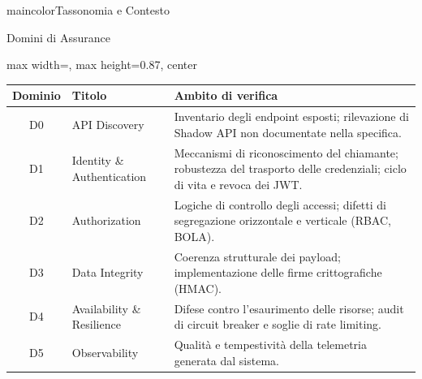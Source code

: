 


\begin{chapter}{maincolor}{Tassonomia e Contesto}
\end{chapter}

\begin{frame}{Domini di Assurance}
  \scriptsize
  \renewcommand{\arraystretch}{0.85}
  \begin{adjustbox}{max width=\textwidth, max height=0.87\textheight, center}
    \begin{tabularx}{\textwidth}{@{} c l >{\raggedright\arraybackslash}X @{}}
      \toprule
      \textbf{Dominio} & \textbf{Titolo}                   & \textbf{Ambito di verifica}                                                                                             \\
      \midrule
      D0               & API Discovery                     & Inventario degli endpoint esposti; rilevazione di Shadow API non documentate nella specifica.                           \\
      D1               & Identity \& Authentication        & Meccanismi di riconoscimento del chiamante; robustezza del trasporto delle credenziali; ciclo di vita e revoca dei JWT. \\
      D2               & Authorization                     & Logiche di controllo degli accessi; difetti di segregazione orizzontale e verticale (RBAC, BOLA).                       \\
      D3               & Data Integrity                    & Coerenza strutturale dei payload; implementazione delle firme crittografiche (HMAC).                                    \\
      D4               & Availability \& Resilience        & Difese contro l'esaurimento delle risorse; audit di circuit breaker e soglie di rate limiting.                          \\
      D5               & Observability                     & Qualità e tempestività della telemetria generata dal sistema.                                                           \\

\end{tabularx}
\end{adjustbox}
\end{frame}
